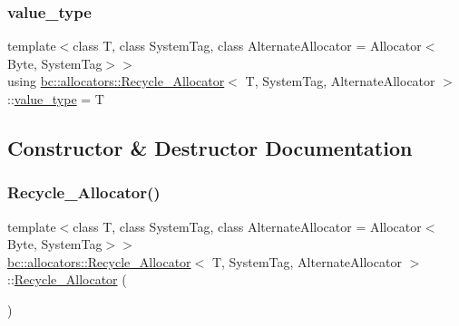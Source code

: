\mbox{\label{structbc_1_1allocators_1_1Recycle__Allocator_af461967c55249583cda104fdf7a79fc9}} 
\subsubsection{\texorpdfstring{value\+\_\+type}{value\_type}}
{\footnotesize\ttfamily template$<$class T, class System\+Tag, class Alternate\+Allocator = Allocator$<$\+Byte, System\+Tag$>$$>$ \\
using \hyperlink{structbc_1_1allocators_1_1Recycle__Allocator}{bc\+::allocators\+::\+Recycle\+\_\+\+Allocator}$<$ T, System\+Tag, Alternate\+Allocator $>$\+::\hyperlink{structbc_1_1allocators_1_1Recycle__Allocator_af461967c55249583cda104fdf7a79fc9}{value\+\_\+type} =  T}



\subsection{Constructor \& Destructor Documentation}
\mbox{\label{structbc_1_1allocators_1_1Recycle__Allocator_a235e55a62d21219403f32b5af24d7864}} 
\subsubsection{\texorpdfstring{Recycle\+\_\+\+Allocator()}{Recycle\_Allocator()}\hspace{0.1cm}{\footnotesize\ttfamily [1/4]}}
{\footnotesize\ttfamily template$<$class T, class System\+Tag, class Alternate\+Allocator = Allocator$<$\+Byte, System\+Tag$>$$>$ \\
\hyperlink{structbc_1_1allocators_1_1Recycle__Allocator}{bc\+::allocators\+::\+Recycle\+\_\+\+Allocator}$<$ T, System\+Tag, Alternate\+Allocator $>$\+::\hyperlink{structbc_1_1allocators_1_1Recycle__Allocator}{Recycle\+\_\+\+Allocator} (\begin{DoxyParamCaption}{ }\end{DoxyParamCaption})\hspace{0.3cm}{\ttfamily [default]}}

